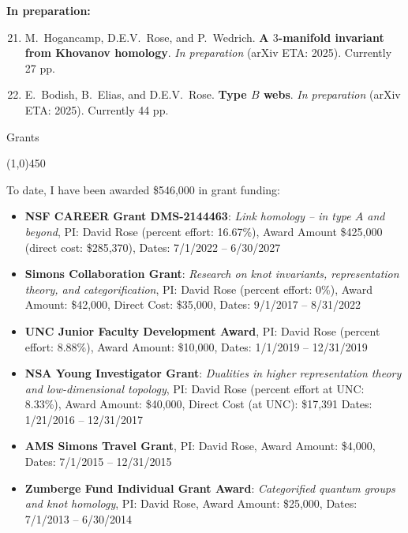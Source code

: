 \documentclass[10pt]{article}
\begin{document}
\noindent\textbf{In preparation:}

\begin{enumerate}
\setcounter{enumi}{20}



\item
M.~Hogancamp, D.E.V.~Rose, and P.~Wedrich.
{\bf A $3$-manifold invariant from Khovanov homology}.
\emph{In preparation} (arXiv ETA: 2025).
Currently 27 pp.

\item 
E.~Bodish, B.~Elias, and D.E.V.~Rose.
{\bf Type $B$ webs}.
\emph{In preparation} (arXiv ETA: 2025).
Currently 44 pp.


\end{enumerate}


\newpage
\noindent
{\large \sc Grants}

\vspace{-0.1in}
\noindent
\line(1,0){450}

\smallskip

\noindent To date, I have been awarded \$546,000 in grant funding:

\begin{itemize}
\item {\bf NSF CAREER Grant DMS-2144463}: 
\emph{Link homology -- in type $A$ and beyond},
PI: David Rose (percent effort: 16.67\%),
Award Amount \$425,000 (direct cost: \$285,370),
Dates: 7/1/2022 -- 6/30/2027

\item {\bf Simons Collaboration Grant}: 
\emph{Research on knot invariants, representation theory, and categorification}, 
PI: David Rose (percent effort: 0\%), 
Award Amount: \$42,000, 
Direct Cost: \$35,000,
Dates: 9/1/2017 -- 8/31/2022

\item {\bf UNC Junior Faculty Development Award},
PI: David Rose (percent effort: 8.88\%), 
Award Amount: \$10,000, 
Dates: 1/1/2019 -- 12/31/2019

\item {\bf NSA Young Investigator Grant}: 
\emph{ Dualities in higher representation theory and low-dimensional topology}, 
PI: David Rose (percent effort at UNC: 8.33\%), 
Award Amount: \$40,000, 
Direct Cost (at UNC): \$17,391
Dates: 1/21/2016 -- 12/31/2017

\item {\bf AMS Simons Travel Grant}, 
PI: David Rose,
Award Amount: \$4,000, 
Dates: 7/1/2015 -- 12/31/2015

 \item {\bf Zumberge Fund Individual Grant Award}: \emph{ Categorified quantum groups and knot homology}, 
 PI: David Rose,
 Award Amount: \$25,000, 
 Dates: 7/1/2013 -- 6/30/2014
\end{itemize}
\end{document}
